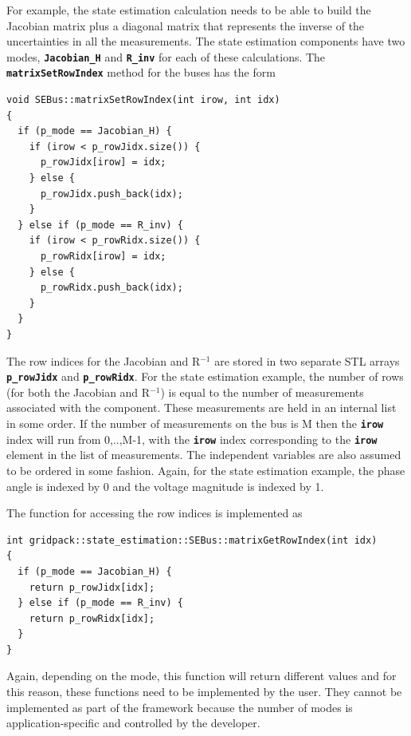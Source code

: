 \documentclass[12pt]{report} %
\begin{document}
For example, the state estimation calculation needs to be able to build the Jacobian matrix plus a diagonal matrix that represents the inverse of the uncertainties in all the measurements. The state estimation components have two modes, \texttt{\textbf{Jacobian\_H}} and \texttt{\textbf{R\_inv}} for each of these calculations. The \texttt{\textbf{matrixSetRowIndex}} method for the buses has the form

{
\color{red}
\begin{Verbatim}[fontseries=b]
void SEBus::matrixSetRowIndex(int irow, int idx)
{
  if (p_mode == Jacobian_H) {
    if (irow < p_rowJidx.size()) {
      p_rowJidx[irow] = idx;
    } else {
      p_rowJidx.push_back(idx);
    }
  } else if (p_mode == R_inv) {
    if (irow < p_rowRidx.size()) {
      p_rowRidx[irow] = idx;
    } else {
      p_rowRidx.push_back(idx);
    }
  }
}
\end{Verbatim}
}

The row indices for the Jacobian and R${}^{-1}$ are stored in two separate STL arrays \texttt{\textbf{p\_rowJidx}} and \texttt{\textbf{p\_rowRidx}}. For the state estimation example, the number of rows (for both the Jacobian and R${}^{-1}$) is equal to the number of measurements associated with the component. These measurements are held in an internal list in some order. If the number of measurements on the bus is M then the \texttt{\textbf{irow}} index will run from 0,..,M-1, with the \texttt{\textbf{irow}} index corresponding to the \texttt{\textbf{irow}} element in the list of measurements. The independent variables are also assumed to be ordered in some fashion. Again, for the state estimation example, the phase angle is indexed by 0 and the voltage magnitude is indexed by 1. 

The function for accessing the row indices is implemented as

{
\color{red}
\begin{Verbatim}[fontseries=b]
int gridpack::state_estimation::SEBus::matrixGetRowIndex(int idx)
{
  if (p_mode == Jacobian_H) {
    return p_rowJidx[idx];
  } else if (p_mode == R_inv) {
    return p_rowRidx[idx];
  }
}
\end{Verbatim}
}

Again, depending on the mode, this function will return different values and for this reason, these functions need to be implemented by the user. They cannot be implemented as part of the framework because the number of modes is application-specific and controlled by the developer.
\end{document}
